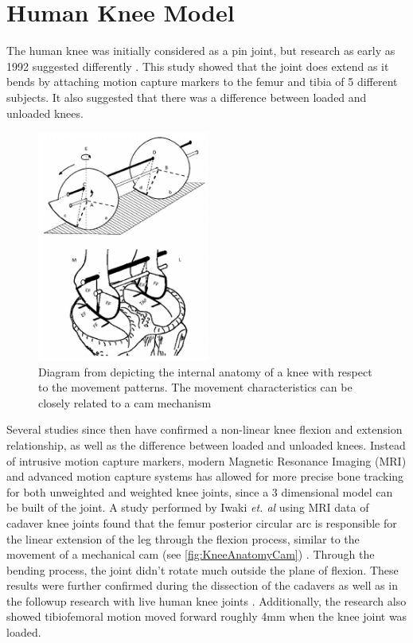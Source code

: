 \section{Human Knee Model}
\label{sec:KneeModel}

The human knee was initially considered as a pin joint, but research as early as 1992 suggested differently \cite{3DKinKneeJointOldStabby}. This study showed that the joint does extend as it bends by attaching motion capture markers to the femur and tibia of 5 different subjects. It also suggested that there was a difference between loaded and unloaded knees. 

\begin{figure}[ht!]
    \centering
    \includegraphics[width=0.5\textwidth]{Figures/Background/KneeAnatomy1.png}
    \caption{Diagram from \cite{MRIKneeShape_Unloaded} depicting the internal anatomy of a knee with respect to the movement patterns. The movement characteristics can be closely related to a cam mechanism}
    \label{fig:KneeAnatomyCam}
\end{figure}

Several studies since then have confirmed a non-linear knee flexion and extension relationship, as well as the difference between loaded and unloaded knees. Instead of intrusive motion capture markers, modern Magnetic Resonance Imaging (MRI) and advanced motion capture systems \cite{ModelAnalysisDeepKneeFlexion} has allowed for more precise bone tracking for both unweighted and weighted knee joints, since a 3 dimensional model can be built of the joint. A study performed by Iwaki \textit{et. al} using MRI data of cadaver knee joints found that the femur posterior circular arc is responsible for the linear extension of the leg through the flexion process, similar to the movement of a mechanical cam (see \autoref{fig:KneeAnatomyCam}) \cite{MRIKneeShape_Unloaded}. Through the bending process, the joint didn't rotate much outside the plane of flexion. These results were further confirmed during the dissection of the cadavers as well as in the followup research with live human knee joints \cite{MRIKneeShape_Loaded}. Additionally, the research also showed tibiofemoral motion moved forward roughly 4mm when the knee joint was loaded.

